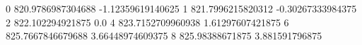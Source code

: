 0 820.9786987304688 -1.12359619140625
1 821.7996215820312 -0.30267333984375
2 822.102294921875 0.0
4 823.7152709960938 1.61297607421875
6 825.7667846679688 3.66448974609375
8 825.98388671875 3.881591796875
